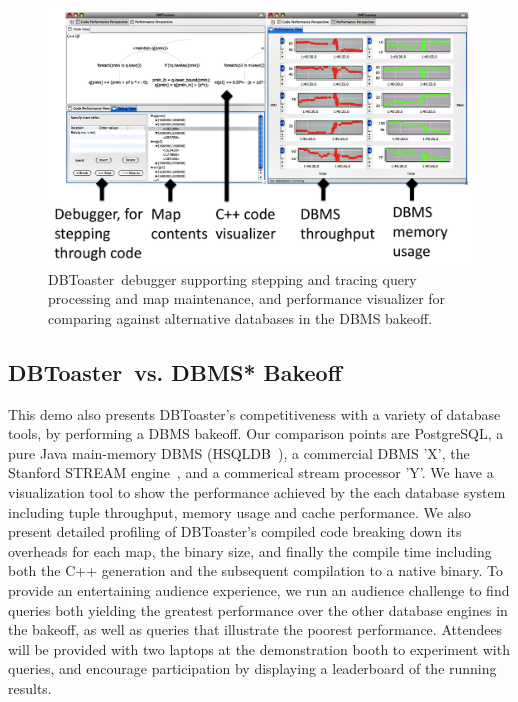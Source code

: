 \documentclass{vldb}
\newcommand{\compiler}{DBToaster}
\begin{document}
\begin{figure}[tb]
\begin{center}
\includegraphics[scale=0.088]{figures/dbt-gui2}
\end{center}
\caption{\compiler\ debugger supporting stepping and tracing query processing and
map maintenance, and performance visualizer for comparing against alternative
databases in the DBMS bakeoff.}
\label{fig:debugperfgui}
\end{figure}

\subsection{\compiler\ vs. DBMS* Bakeoff}
This demo also presents \compiler's competitiveness with a variety of database
tools, by performing a DBMS bakeoff. Our comparison points are PostgreSQL, a pure
Java main-memory DBMS (HSQLDB~\cite{hsqldb-url}), a commercial DBMS 'X', the
Stanford STREAM engine~\cite{motwani-cidr:03}, and a commerical stream processor
'Y'. We have a visualization tool to show the performance achieved by the each
database system including tuple throughput, memory usage and cache performance.
We also present detailed profiling of \compiler's compiled code breaking down its
overheads for each map, the binary size, and finally the compile time including
both the C++ generation and the subsequent compilation to a native binary. To
provide an entertaining audience experience, we run an audience challenge to find
queries both yielding the greatest performance over the other database engines in
the bakeoff, as well as queries that illustrate the poorest performance.
Attendees will be provided with two laptops at the demonstration booth to
experiment with queries, and encourage participation by displaying a leaderboard
of the running results.




\end{document}
